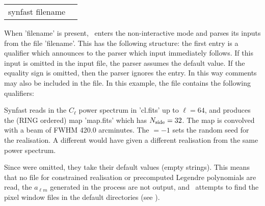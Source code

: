 \begin{examples}{2}
{
\begin{tabular}{ll} %
synfast  filename \\
\end{tabular}
}
{When 'filename' is present, \thedocid\ enters the non-interactive mode and parses
its inputs from the file 'filename'. This has the following
structure: the first entry is a qualifier which announces to the parser
which input immediately follows. If this input is omitted in the
input file, the parser assumes the default value.
If the equality sign is omitted, then the parser ignores the entry.
In this way comments may also be included in the file.
In this example, the file contains the following qualifiers:\hfill\newline
{}

Synfast reads in the $C_{\ell}$ power spectrum in 'cl.fits' up to $\ell=64$, and
produces the (RING ordered) map
'map.fits' which has $N_{\mathrm{side}}=32$.
The map is convolved with a beam of FWHM 420.0 arcminutes. The 
$=-1$ sets
the random seed for the realisation. A different 
 would have given a different 
realisation from the same power spectrum.

Since \hfill\newline
{}
were omitted, they take their default values (empty strings). 
This means that no file for constrained realisation or precomputed
Legendre polynomials are read, the $a_{\ell m}$ generated in the process are not
output, and \thedocid\ attempts to find the pixel
window files in the default directories (see 
%
).
}
\end{examples}

